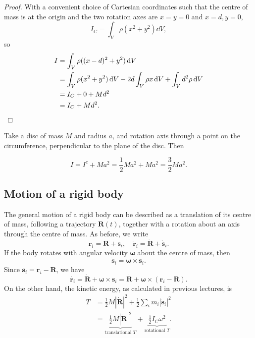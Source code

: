 \begin{proof}
  With a convenient choice of Cartesian coordinates such that the centre of mass is at the origin and the two rotation axes are $x = y =0$ and $x = d, y = 0$,
  \[
    I_C = \int_V \rho (x^2 + y^2) \dd V,
  \]
  so
  \begin{align*}
    I &= \int_V \rho((x - d)^2 + y^2)\,\mathrm{d} V\\
    &=\int_V \rho (x^2 + y^2)\,\mathrm{d} V - 2d\int_V \rho x\,\mathrm{d} V + \int_V d^2 \rho\,\mathrm{d} V\\
    &= I_C + 0 + Md^2\\
    &= I_C + Md^2.\qedhere
  \end{align*}
\end{proof}
\begin{example}
  Take a disc of mass $M$ and radius $a$, and rotation axis through a point on the circumference, perpendicular to the plane of the disc. Then
  \begin{center}
  \end{center}
  \[
    I = I^c + Ma^2 = \frac{1}{2}Ma^2 + Ma^2 = \frac{3}{2}Ma^2.
  \]
\end{example}

\subsection{Motion of a rigid body}
The general motion of a rigid body can be described as a translation of its centre of mass, following a trajectory $\mathbf{R}(t)$, together with a rotation about an axis through the centre of mass. As before, we write
\[
  \mathbf{r}_i = \mathbf{R} + \mathbf{s}_i,\quad\dot{\mathbf{r}}_i = \dot{\mathbf{R}} + \dot{\mathbf{s}}_i. 
\]
If the body rotates with angular velocity $\boldsymbol\omega$ about the centre of mass, then
\[
  \dot{\mathbf{s}}_i = \boldsymbol\omega \times \mathbf{s}_i.
\]
Since $\mathbf{s}_i = \mathbf{r}_i - \mathbf{R}$, we have
\[
  \dot{\mathbf{r}_i} = \dot{\mathbf{R}} + \boldsymbol \omega \times \mathbf{s}_i = \dot{\mathbf{R}} + \boldsymbol\omega\times (\mathbf{r}_i - \mathbf{R}).
\]
On the other hand, the kinetic energy, as calculated in previous lectures, is
\begin{align*}
  T &= \frac{1}{2}M|\dot{\mathbf{R}}|^2 + \frac{1}{2}\sum_i m_i |\dot{\mathbf{s}}_i|^2\\
  &= \underbrace{\frac{1}{2}M|\dot{\mathbf{R}}|^2}_{\text{translational $T$}} + \underbrace{\frac{1}{2}I_C\omega^2}_{\text{rotational $T$}}.
\end{align*}

